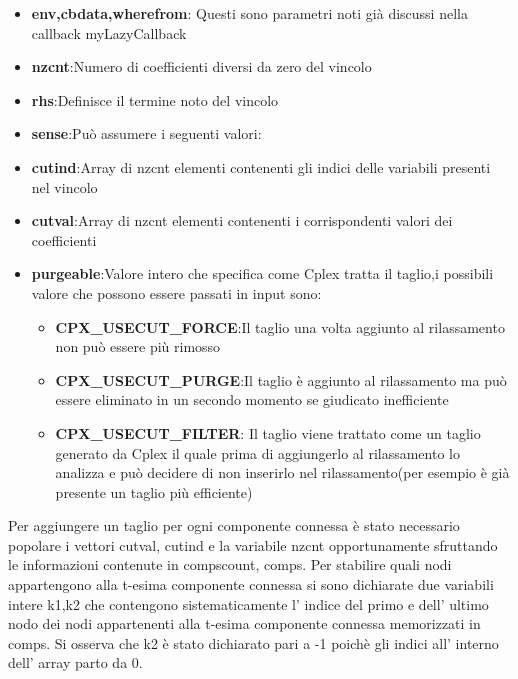 \documentclass[11pt]{article}
\begin{document}
\begin{itemize}
	\item \textbf{env,cbdata,wherefrom}: Questi sono parametri noti già discussi nella callback myLazyCallback
	\item \textbf{nzcnt}:Numero di coefficienti diversi da zero del vincolo
	\item \textbf{rhs}:Definisce il termine noto del vincolo
	\item \textbf{sense}:Può assumere i seguenti valori:


	\item \textbf{cutind}:Array di  nzcnt elementi contenenti gli indici delle variabili presenti nel vincolo
	\item \textbf{cutval}:Array di  nzcnt elementi contenenti i corrispondenti valori dei coefficienti
	\item \textbf{purgeable}:Valore intero che specifica come Cplex tratta il taglio,i possibili valore che possono essere passati in input sono:
	
	\begin{itemize}
	\item \textbf{CPX_USECUT_FORCE}:Il taglio una volta aggiunto al rilassamento non può essere più rimosso
	\item \textbf{CPX_USECUT_PURGE}:Il taglio è aggiunto al rilassamento ma può essere eliminato in un secondo momento se giudicato inefficiente
	\item \textbf{CPX_USECUT_FILTER}: Il taglio viene trattato come un taglio generato da Cplex il quale prima di aggiungerlo al rilassamento lo analizza e può decidere di non inserirlo 
	nel rilassamento(per esempio è già presente un taglio più efficiente)
	
	\end{itemize}

    
\end{itemize}

Per aggiungere un taglio per ogni componente connessa è stato necessario popolare i vettori cutval, cutind e la variabile nzcnt opportunamente sfruttando le informazioni contenute in compscount, comps. Per stabilire quali nodi appartengono alla t-esima componente connessa si sono dichiarate due variabili intere k1,k2 che contengono sistematicamente l' indice del primo e dell' ultimo nodo dei nodi appartenenti alla t-esima componente connessa memorizzati in comps. Si osserva che k2 è stato dichiarato pari a -1 poichè gli indici all' interno dell' array parto da 0. 
\end{document}
